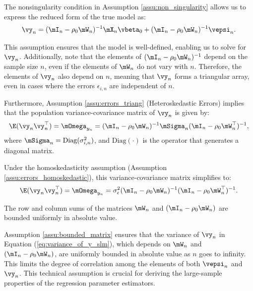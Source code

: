 \documentclass[english,12pt]{book}\usepackage[]{graphicx}\usepackage[]{xcolor}
\begin{document}
The nonsingularity condition in Assumption \ref{assu:non_singularity} allows us to express the reduced form of the true model as:
\begin{equation*}
  \vy_n = (\mI_n - \rho_0\mW_n)^{-1}\mX_n\vbeta_0 + (\mI_n - \rho_0\mW_n)^{-1}\vepsi_n.
\end{equation*}

This assumption ensures that the model is well-defined, enabling us to solve for $\vy_n$. Additionally, \cite{kelejian1998generalized} note that the elements of $(\mI_n - \rho_0\mW_n)^{-1}$ depend on the sample size $n$, even if the elements of $\mW_n$ do not vary with $n$. Therefore, the elements of $\vy_n$ also depend on $n$, meaning that $\vy_n$ forms a triangular array, even in cases where the errors $\epsilon_{i,n}$ are independent of $n$. 

Furthermore, Assumption \ref{assu:errors_triang} (Heteroskedastic Errors) implies that the population variance-covariance matrix of $\vy_n$ is given by:
\begin{equation}\label{eq:variance_of_y_slm}
  \E(\vy_n\vy^\top_n) = \mOmega_{y_n}= (\mI_n - \rho_0\mW_n)^{-1}\mSigma_n(\mI_n - \rho_0\mW^\top_n)^{-1},
\end{equation}
%
where $\mSigma_n = \textrm{Diag}(\sigma^2_{i, n})$, and $\textrm{Diag}(\cdot)$ is the operator that generates a diagonal matrix. 

Under the homoskedasticity assumption (Assumption \ref{assu:errors_homoskedastic}), this variance-covariance matrix simplifies to:
\begin{equation}\label{eq:variance_of_y_slm-homo}
  \E(\vy_n\vy^\top_n) = \mOmega_{y_n} = \sigma^2_{\epsilon}(\mI_n - \rho_0\mW_n)^{-1}(\mI_n - \rho_0\mW^\top_n)^{-1}.
\end{equation}

\begin{assumption}\label{assu:bounded_matrix}
The row and column sums of the matrices $\mW_n$ and $(\mI_n - \rho_0\mW_n)$ are bounded uniformly in absolute value.
\end{assumption}


Assumption \ref{assu:bounded_matrix} ensures that the variance of $\vy_n$  in Equation (\ref{eq:variance_of_y_slm}), which depends on $\mW_n$ and $(\mI_n - \rho_0\mW_n)$, are uniformly bounded in absolute value as $n$ goes to infinity.  This limits the degree of correlation among the elements of both $\vepsi_n$ and $\vy_n$. This technical assumption is crucial for deriving the large-sample properties of the regression parameter estimators. 
\end{document}
